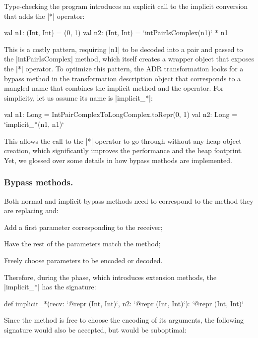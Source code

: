 Type-checking the program introduces an explicit call to the implicit conversion that adds the |*| operator:

\begin{lstlisting-nobreak}
val n1: (Int, Int) = (0, 1)
val n2: (Int, Int) = `intPairIsComplex(n1)` * n1
\end{lstlisting-nobreak}

This is a costly pattern, requiring |n1| to be decoded into a pair and passed to the |intPairIsComplex| method, which itself creates a wrapper object that exposes the |*| operator. To optimize this pattern, the ADR transformation looks for a bypass method in the transformation description object that corresponds to a mangled name that combines the implicit method and the operator. For simplicity, let us assume its name is |implicit_*|:

\begin{lstlisting-nobreak}
val n1: Long = IntPairComplexToLongComplex.toRepr(0, 1)
val n2: Long = `implicit_*(n1, n1)`
\end{lstlisting-nobreak}

This allows the call to the |*| operator to go through without any heap object creation, which significantly improves the performance and the heap footprint. Yet, we glossed over some details in how bypass methods are implemented.

\subsubsection{Bypass methods.} Both normal and implicit bypass methods need to correspond to the method they are replacing and:
\begin{compactitem}
\item Add a first parameter corresponding to the receiver;
\item Have the rest of the parameters match the method;
\item Freely choose parameters to be encoded or decoded.
\end{compactitem}

Therefore, during the \coerce{} phase, which introduces extension methods, the |implicit_*| has the signature:

\begin{lstlisting-nobreak}
def implicit_*(recv: `@repr (Int, Int)`,  n2: `@repr (Int, Int)`): `@repr (Int, Int)`
\end{lstlisting-nobreak}

Since the method is free to choose the encoding of its arguments, the following signature would also be accepted, but would be suboptimal:

